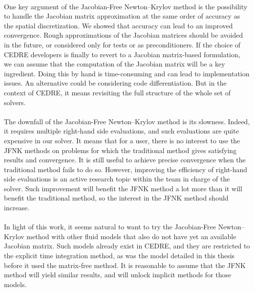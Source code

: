     \paragraph{}
    One key argument of the Jacobian-Free Newton--Krylov method is the possibility to handle the Jacobian matrix approximation at the same order of accuracy as the spatial discretization.
    We showed that accuracy can lead to an improved convergence.
    Rough approximations of the Jacobian matrices should be avoided in the future, or considered only for tests or as preconditioners.
    If the choice of CEDRE developers is finally to revert to a Jacobian matrix-based formulation, we can assume that the computation of the Jacobian matrix will be a key ingredient.
    Doing this by hand is time-consuming and can lead to implementation issues.
    An alternative could be considering code differentiation.
    But in the context of CEDRE, it means revisiting the full structure of the whole set of solvers.

    \paragraph{}
    The downfall of the Jacobian-Free Newton--Krylov method is its slowness.
    Indeed, it requires multiple right-hand side evaluations, and such evaluations are quite expensive in our solver.
    It means that for a user, there is no interest to use the JFNK methods on problems for which the traditional method gives satisfying results and convergence.
    It is still useful to achieve precise convergence when the traditional method fails to do so.
    However, improving the efficiency of right-hand side evaluations is an active research topic within the team in charge of the solver.
    Such improvement will benefit the JFNK method a lot more than it will benefit the traditional method, so the interest in the JFNK method should increase.

    \paragraph{}
    In light of this work, it seems natural to want to try the Jacobian-Free Newton--Krylov method with other fluid models that also do not have yet an available Jacobian matrix.
    Such models already exist in CEDRE, and they are restricted to the explicit time integration method, as was the model detailed in this thesis before it used the matrix-free method.
    It is reasonable to assume that the JFNK method will yield similar results, and will unlock implicit methods for those models.

